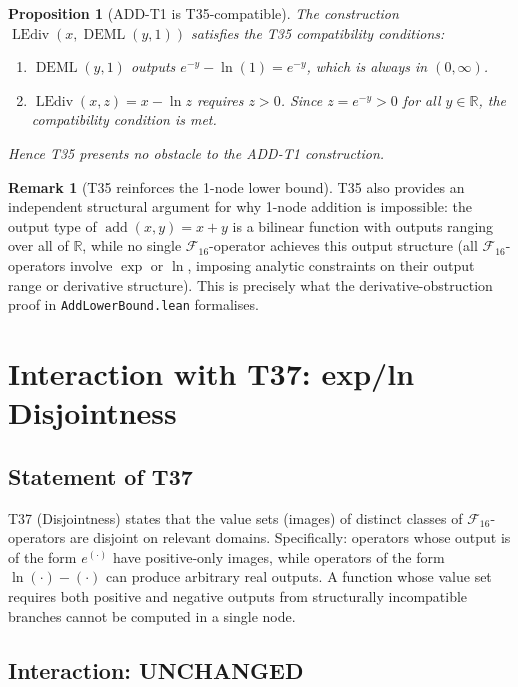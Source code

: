 \documentclass[12pt,a4paper]{article}
\newtheorem{proposition}[theorem]{Proposition}
\theoremstyle{definition}
\newtheorem{remark}[theorem]{Remark}
\newcommand{\DEML}{\operatorname{DEML}}
\newcommand{\LEdiv}{\operatorname{LEdiv}}
\newcommand{\addop}{\operatorname{add}}
\newcommand{\F}{\mathcal{F}_{16}}
\newcommand{\R}{\mathbb{R}}
\newcommand{\Unchanged}{\textcolor{unchanged}{\textbf{UNCHANGED}}}
\begin{document}
\begin{proposition}[ADD-T1 is T35-compatible]
The construction $\LEdiv(x,\DEML(y,1))$ satisfies the T35 compatibility conditions:
\begin{enumerate}
\item $\DEML(y,1)$ outputs $e^{-y}-\ln(1) = e^{-y}$, which is always in $(0,\infty)$.
\item $\LEdiv(x,z) = x - \ln z$ requires $z>0$.  Since $z = e^{-y} > 0$ for all
  $y\in\R$, the compatibility condition is met.
\end{enumerate}
Hence T35 presents no obstacle to the ADD-T1 construction.
\end{proposition}

\begin{remark}[T35 reinforces the 1-node lower bound]
T35 also provides an independent structural argument for why 1-node addition
is impossible: the output type of $\addop(x,y)=x+y$ is a bilinear function
with outputs ranging over all of $\R$, while no single $\F$-operator achieves
this output structure (all $\F$-operators involve $\exp$ or $\ln$, imposing
analytic constraints on their output range or derivative structure).
This is precisely what the derivative-obstruction proof in \texttt{AddLowerBound.lean}
formalises.
\end{remark}

\section{Interaction with T37: exp/ln Disjointness}
\label{sec:T37}

\subsection{Statement of T37}

T37 (Disjointness) states that the value sets (images) of distinct classes of
$\F$-operators are disjoint on relevant domains.  Specifically:
operators whose output is of the form $e^{(\cdot)}$ have positive-only images,
while operators of the form $\ln(\cdot)-(\cdot)$ can produce arbitrary real outputs.
A function whose value set requires both positive and negative outputs from
structurally incompatible branches cannot be computed in a single node.

\subsection{Interaction: \Unchanged}
\end{document}
